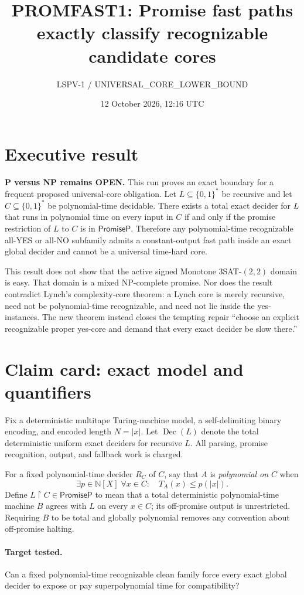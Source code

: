 \documentclass[11pt]{article}
\title{PROMFAST1: Promise fast paths exactly classify recognizable candidate cores}
\author{LSPV-1 / UNIVERSAL\_CORE\_LOWER\_BOUND}
\date{12 October 2026, 12:16 UTC}
\newcommand{\PromiseP}{\mathsf{PromiseP}}
\begin{document}
\maketitle

\section*{Executive result}
\textbf{P versus NP remains OPEN.}  This run proves an exact boundary for a
frequent proposed universal-core obligation.  Let $L\subseteq\{0,1\}^*$ be
recursive and let $C\subseteq\{0,1\}^*$ be polynomial-time decidable.  There
exists a total exact decider for $L$ that runs in polynomial time on every
input in $C$ if and only if the promise restriction of $L$ to $C$ is in
$\PromiseP$.  Therefore any polynomial-time recognizable all-YES or all-NO
subfamily admits a constant-output fast path inside an exact global decider
and cannot be a universal time-hard core.

This result does not show that the active signed Monotone $3$SAT-$(2,2)$
domain is easy.  That domain is a mixed NP-complete promise.  Nor does the
result contradict Lynch's complexity-core theorem: a Lynch core is merely
recursive, need not be polynomial-time recognizable, and need not lie inside
the yes-instances.  The new theorem instead closes the tempting repair
``choose an explicit recognizable proper yes-core and demand that every exact
decider be slow there.''

\section{Claim card: exact model and quantifiers}
Fix a deterministic multitape Turing-machine model, a self-delimiting binary
encoding, and encoded length $N=|x|$.  Let
$\operatorname{Dec}(L)$ denote the total deterministic uniform exact
deciders for recursive $L$.  All parsing, promise recognition, output, and
fallback work is charged.

For a fixed polynomial-time decider $R_C$ of $C$, say that $A$ is
\emph{polynomial on $C$} when
\[
 \exists p\in\mathbb N[X]\;\forall x\in C:\quad T_A(x)\le p(|x|).
\]
Define $L\upharpoonright C\in\PromiseP$ to mean that a total deterministic
polynomial-time machine $B$ agrees with $L$ on every $x\in C$; its
off-promise output is unrestricted.  Requiring $B$ to be total and globally
polynomial removes any convention about off-promise halting.

\paragraph{Target tested.}
Can a fixed polynomial-time recognizable clean family force every exact
global decider to expose or pay superpolynomial time for compatibility?
\end{document}
